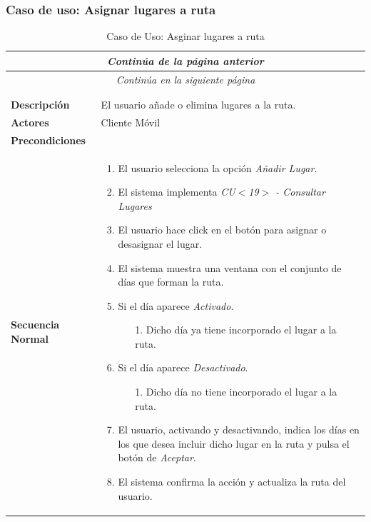 \newpage
\subsubsection*{Caso de uso: Asignar lugares a ruta }
\begin{longtable}{| p{4cm} | p{10cm} |}
\endfirsthead
\multicolumn{2}{c}{\textit{Continúa de la página anterior}}\\[12pt]
\hline
\endhead
\hline
\multicolumn{2}{c}{\textit{Continúa en la siguiente página}} \\
\endfoot
\hline
\caption{Caso de Uso: Asginar lugares a ruta}\label{fig:1}\\
\endlastfoot


\hline
\multicolumn{2}{|c|}{\textbf{CU$<$20$>$ - Asignar Lugares a Ruta}} \\

\hline
\textbf{Descripción} &
El usuario añade o elimina lugares a la ruta.\\

\hline
\textbf{Actores} &
Cliente Móvil\\

\hline
\textbf{Precondiciones} &
\\

\hline
\textbf{Secuencia Normal} &\mbox{}\par\vspace{-\baselineskip}
\begin{enumerate}[leftmargin=0.7cm, topsep=0.1cm]
\item El usuario selecciona la opción \textit{Añadir Lugar}.
\item El sistema implementa \textit{CU$<$19$>$ - Consultar Lugares}
\item El usuario hace click en el botón para asignar o desasignar el lugar.
\item El sistema muestra una ventana con el conjunto de días que forman la ruta.
\item Si el día aparece \textit{Activado}.
	\begin{itemize}
	\item[1.] Dicho día ya tiene incorporado el lugar a la ruta.
	\end{itemize}
\item Si el día aparece \textit{Desactivado}.
	\begin{itemize}
	\item[1.] Dicho día no tiene incorporado el lugar a la ruta.
	\end{itemize}
\item El usuario, activando y desactivando, indica los días en los que desea incluir dicho lugar en la ruta y pulsa el botón de \textit{Aceptar}.
\item El sistema confirma la acción y actualiza la ruta del usuario.


\end{enumerate}
\end{longtable}

